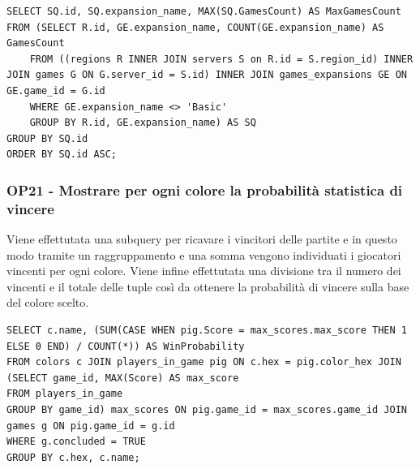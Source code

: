 \begin{lstlisting}[style=sql]
SELECT SQ.id, SQ.expansion_name, MAX(SQ.GamesCount) AS MaxGamesCount
FROM (SELECT R.id, GE.expansion_name, COUNT(GE.expansion_name) AS GamesCount
    FROM ((regions R INNER JOIN servers S on R.id = S.region_id) INNER JOIN games G ON G.server_id = S.id) INNER JOIN games_expansions GE ON GE.game_id = G.id
    WHERE GE.expansion_name <> 'Basic'
    GROUP BY R.id, GE.expansion_name) AS SQ
GROUP BY SQ.id
ORDER BY SQ.id ASC;
\end{lstlisting}

\subsubsection*{OP21 - Mostrare per ogni colore la probabilità statistica di vincere}
Viene effettutata una subquery per ricavare i vincitori delle partite e in questo modo tramite un raggruppamento e una somma vengono individuati i giocatori vincenti per ogni colore. Viene infine effettutata una divisione tra il numero dei vincenti e il totale delle tuple così da ottenere la probabilità di vincere sulla base del colore scelto.
\medskip

\begin{lstlisting}[style=sql]
SELECT c.name, (SUM(CASE WHEN pig.Score = max_scores.max_score THEN 1 ELSE 0 END) / COUNT(*)) AS WinProbability
FROM colors c JOIN players_in_game pig ON c.hex = pig.color_hex JOIN (SELECT game_id, MAX(Score) AS max_score
FROM players_in_game
GROUP BY game_id) max_scores ON pig.game_id = max_scores.game_id JOIN games g ON pig.game_id = g.id
WHERE g.concluded = TRUE
GROUP BY c.hex, c.name;
\end{lstlisting}
